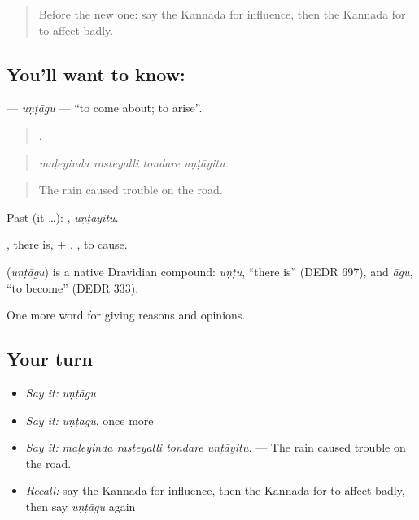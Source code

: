 \label{lesson:KA-C385-untagu}



\begin{quote}
Before the new one: say the Kannada for influence, then the Kannada for to affect badly.
\end{quote}

\subsection*{You'll want to know: }
\textbf{} — \emph{uṇṭāgu} — \textquotedblleft{}to come about; to arise\textquotedblright{}.

\begin{quote}
   .
\end{quote}

\begin{quote}
\emph{maḷeyinda rasteyalli tondare uṇṭāyitu.}
\end{quote}

\begin{quote}
The rain caused trouble on the road.
\end{quote}

Past (it …): , \emph{uṇṭāyitu}.

, there is, + . , to cause.

\begin{cousinweb}
\textbf{} (\emph{uṇṭāgu}) is a native Dravidian compound: \emph{uṇṭu}, \textquotedblleft{}there is\textquotedblright{} (DEDR 697), and \emph{āgu}, \textquotedblleft{}to become\textquotedblright{} (DEDR 333).
\end{cousinweb}

\begin{grammarlens}[title={What you've built}]
One more word for giving reasons and opinions.
\end{grammarlens}

\subsection*{Your turn}
\begin{itemize}
\raggedright
  \item \emph{Say it:} \emph{uṇṭāgu}
  \item \emph{Say it:} \emph{uṇṭāgu}, once more
  \item \emph{Say it:} \emph{maḷeyinda rasteyalli tondare uṇṭāyitu.} — The rain caused trouble on the road.
  \item \emph{Recall:} say the Kannada for influence, then the Kannada for to affect badly, then say \emph{uṇṭāgu} again
\end{itemize}

